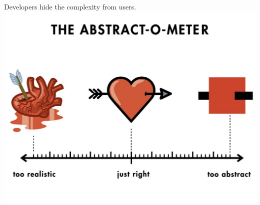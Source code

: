 \documentclass[aspectratio=169, 14pt]{beamer}
\begin{document}
\begin{frame}
	\begin{center}
		Developers hide the complexity from users.
		\includegraphics[height=.8\paperheight]{image/heart}
	\end{center}


\end{frame}
\end{document}
